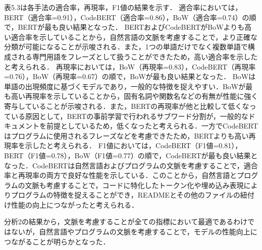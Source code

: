 \documentclass[submit]{ipsj}
\begin{document}
表5.3は各手法の適合率，再現率，F1値の結果を示す．
適合率においては，BERT（適合率=0.91），CodeBERT（適合率=0.86），BoW（適合率=0.74）の順で，BERTが最も良い結果となった．
BERTおよびCodeBERTがBoWよりも高い適合率を示していることから，自然言語の文脈を考慮することで，より正確な分類が可能になることが示唆される．また，1つの単語だけでなく複数単語で構成される専門用語をフレーズとして扱うことができたため，高い適合率を示したと考えられる．
再現率においては，BoW（再現率=0.83），CodeBERT（再現率=0.76），BoW（再現率=0.67）の順で，BoWが最も良い結果となった．
BoWは単語の出現頻度に基づくモデルであり，一般的な特徴を捉えやすい．BoWが最も高い再現率を示していることから，固有名詞や関数名などの有無が性能に強く寄与していることが示唆される．また，BERTの再現率が他と比較して低くなっている原因として，BERTの事前学習で行われるサブワード分割が，一般的なドキュメントを前提としているため，低くなったと考えられる．一方でCodeBERTはプログラムに使用されるフレーズなどを考慮できたため，BERTよりも高い再現率を示したと考えられる．
F1値においては，CodeBERT（F1値=0.81），BERT（F1値=0.78），BoW（F1値=0.77）の順で，CodeBERTが最も良い結果となった．CodeBERTは自然言語およびプログラムの文脈を考慮することで，適合率と再現率の両方で良好な性能を示している．このことから，自然言語とプログラムの文脈も考慮することで，コードに特化したトークン化や埋め込み表現によりプログラムの特徴を捉えることができ，READMEとその他のファイルの紐付け性能の向上につながったと考えられる．

分析2の結果から，文脈を考慮することが全ての指標において最適であるわけではないが，自然言語やプログラムの文脈を考慮することで，モデルの性能向上につながることが明らかとなった．


%
\end{document}
